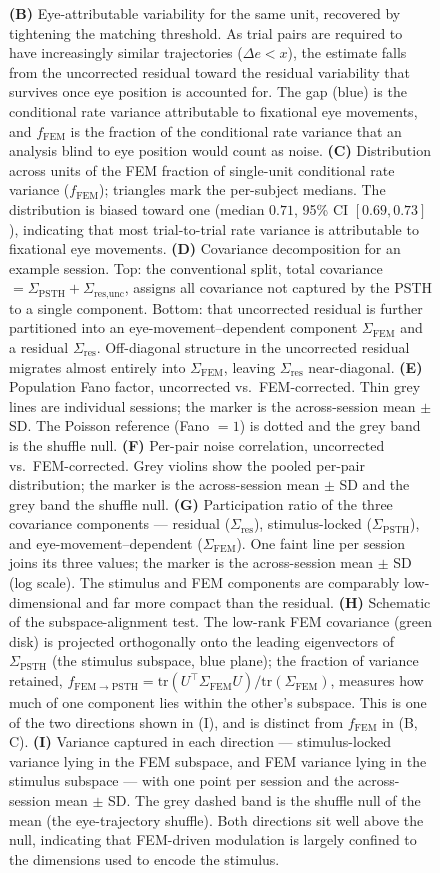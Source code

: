 \documentclass{lite}
\newcommand{\Cpsth}{\Sigma_{\text{PSTH}}}
\newcommand{\Cfem}{\Sigma_{\text{FEM}}}
\begin{document}
\begin{figure}[!t]
  \ContinuedFloat
  \captionsetup{font=footnotesize,singlelinecheck=false}
  \caption{
  \textbf{(B)} Eye-attributable variability for the same unit, recovered by tightening the matching threshold. As trial pairs are required to have increasingly similar trajectories ($\Delta e < x$), the estimate falls from the uncorrected residual toward the residual variability that survives once eye position is accounted for. The gap (blue) is the conditional rate variance attributable to fixational eye movements, and $f_{\text{FEM}}$ is the fraction of the conditional rate variance that an analysis blind to eye position would count as noise.
  \textbf{(C)} Distribution across units of the FEM fraction of single-unit conditional rate variance ($f_{\text{FEM}}$); triangles mark the per-subject medians. The distribution is biased toward one (median $0.71$, 95\% CI $[0.69, 0.73]$), indicating that most trial-to-trial rate variance is attributable to fixational eye movements.
  \textbf{(D)} Covariance decomposition for an example session. Top: the conventional split, total covariance $= \Cpsth + \Sigma_{\text{res}, \text{unc}}$, assigns all covariance not captured by the PSTH to a single component. Bottom: that uncorrected residual is further partitioned into an eye-movement--dependent component $\Cfem$ and a residual $\Sigma_{\text{res}}$. Off-diagonal structure in the uncorrected residual migrates almost entirely into $\Cfem$, leaving $\Sigma_{\text{res}}$ near-diagonal.
  \textbf{(E)} Population Fano factor, uncorrected vs.\ FEM-corrected. Thin grey lines are individual sessions; the marker is the across-session mean $\pm$ SD. The Poisson reference (Fano $=1$) is dotted and the grey band is the shuffle null.
  \textbf{(F)} Per-pair noise correlation, uncorrected vs.\ FEM-corrected. Grey violins show the pooled per-pair distribution; the marker is the across-session mean $\pm$ SD and the grey band the shuffle null.
  \textbf{(G)} Participation ratio of the three covariance components --- residual ($\Sigma_{\text{res}}$), stimulus-locked ($\Cpsth$), and eye-movement--dependent ($\Cfem$). One faint line per session joins its three values; the marker is the across-session mean $\pm$ SD (log scale). The stimulus and FEM components are comparably low-dimensional and far more compact than the residual.
  \textbf{(H)} Schematic of the subspace-alignment test. The low-rank FEM covariance (green disk) is projected orthogonally onto the leading eigenvectors of $\Cpsth$ (the stimulus subspace, blue plane); the fraction of variance retained, $f_{\mathrm{FEM}\to\mathrm{PSTH}} = \mathrm{tr}(U^\top\Cfem U)/\mathrm{tr}(\Cfem)$, measures how much of one component lies within the other's subspace. This is one of the two directions shown in (I), and is distinct from $f_{\text{FEM}}$ in (B, C).
  \textbf{(I)} Variance captured in each direction --- stimulus-locked variance lying in the FEM subspace, and FEM variance lying in the stimulus subspace --- with one point per session and the across-session mean $\pm$ SD. The grey dashed band is the shuffle null of the mean (the eye-trajectory shuffle). Both directions sit well above the null, indicating that FEM-driven modulation is largely confined to the dimensions used to encode the stimulus.
  }
\end{figure}
\end{document}
